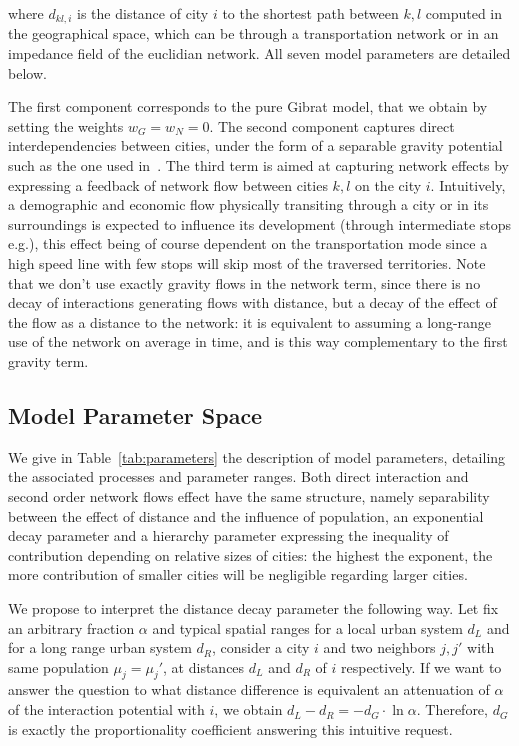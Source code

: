 \documentclass[Royal,sageh,times]{sagej}
\begin{document}
where $d_{kl,i}$ is the distance of city $i$ to the shortest path between $k,l$ computed in the geographical space, which can be through a transportation network or in an impedance field of the euclidian network. All seven model parameters are detailed below.


The first component corresponds to the pure Gibrat model, that we obtain by setting the weights $w_G = w_N = 0$. The second component captures direct interdependencies between cities, under the form of a separable gravity potential such as the one used in~\cite{sanders1992systeme}. The third term is aimed at capturing network effects by expressing a feedback of network flow between cities $k,l$ on the city $i$. Intuitively, a demographic and economic flow physically transiting through a city or in its surroundings is expected to influence its development (through intermediate stops e.g.), this effect being of course dependent on the transportation mode since a high speed line with few stops will skip most of the traversed territories. Note that we don't use exactly gravity flows in the network term, since there is no decay of interactions generating flows with distance, but a decay of the effect of the flow as a distance to the network: it is equivalent to assuming a long-range use of the network on average in time, and is this way complementary to the first gravity term.


\subsection*{Model Parameter Space}

We give in Table~\ref{tab:parameters} the description of model parameters, detailing the associated processes and parameter ranges. Both direct interaction and second order network flows effect have the same structure, namely separability between the effect of distance and the influence of population, an exponential decay parameter and a hierarchy parameter expressing the inequality of contribution depending on relative sizes of cities: the highest the exponent, the more contribution of smaller cities will be negligible regarding larger cities.

We propose to interpret the distance decay parameter the following way. Let fix an arbitrary fraction $\alpha$ and typical spatial ranges for a local urban system $d_L$ and for a long range urban system $d_R$, consider a city $i$ and two neighbors $j,j'$ with same population $\mu_j=\mu_j'$, at distances $d_L$ and $d_R$ of $i$ respectively. If we want to answer the question to what distance difference is equivalent an attenuation of $\alpha$ of the interaction potential with $i$, we obtain $d_L - d_R = -d_G\cdot \ln \alpha$. Therefore, $d_G$ is exactly the proportionality coefficient answering this intuitive request.
\end{document}
